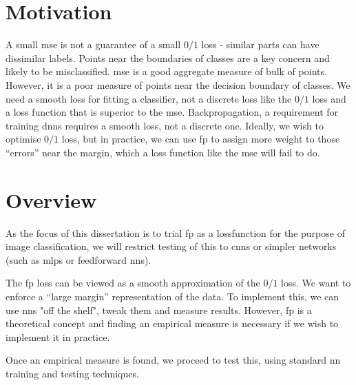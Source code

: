\section{Motivation}

A small  \gls{mse} is not a guarantee of a small $0/1$ loss - similar parts can have dissimilar labels. Points near the boundaries of classes are a key concern and likely to be misclassified.  \gls{mse} is a good aggregate measure of bulk of points. However, it is a poor measure of points near the decision boundary of classes. We need a smooth loss for fitting a classifier, not a discrete loss like the $0/1$ loss and a loss function that is superior to the  \gls{mse}. Backpropagation, a requirement for training \gls{dnn}s requires a smooth loss, not a discrete one. Ideally, we wish to optimise $0/1$ loss, but in practice, we can use \gls{fp} to assign more weight to those \enquote{errors} near the margin, which a loss function like the \gls{mse} will fail to do.
\bigskip

\section{Overview}

As the focus of this dissertation is to trial \gls{fp} as a \gls{lossfunction} for the purpose of image classification, we will restrict testing of this to \gls{cnn}s or simpler networks (such as \gls{mlp}s or \gls{feedforward} \gls{nn}s). 
\bigskip

 The \gls{fp} loss can be viewed as a smooth approximation of the $0/1$ loss. We want to enforce a \enquote{large margin} representation of the data. To implement this, we can use  \gls{nn}s "off the shelf", tweak them and measure results. However, \gls{fp} is a theoretical concept and finding an empirical measure is necessary if we wish to implement it in practice. 
 \bigskip

Once an empirical measure is found, we proceed to test this, using standard \gls{nn} training and testing techniques.
\bigskip